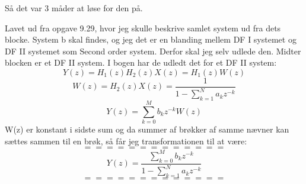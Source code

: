 \begin{Udledninger}
\begin{underrubrik}
        Så det var 3 måder at løse for den på. 
    \end{underrubrik}\clearpage
    \begin{underrubrik}
        \color{teal} Lavet ud fra opgave 9.29, hvor jeg skulle beskrive samlet system ud fra dets blocke. \color{black}
        System b skal findes, og jeg det er en blanding mellem DF I systemet og DF II systemet som Second order system. Derfor skal jeg selv udlede den. 
        Midter blocken er et DF II system.
        I bogen har de udledt det for et DF II system: 
        \[Y(z) = H_1(z)H_2(z)X(z) = H_1(z)W(z)\]
        \[W(z) = H_2(z)X(z) = \frac{1}{1 - \sum_{k = 1}^{N}{a_kz^{-k}}}\]
        \[Y(z) = \sum_{k = 0}^{M}{b_kz^{-k}W(z)}\]
        W(z) er konstant i sidste sum og da summer af brøkker af samme nævner kan sættes sammen til en brøk, så får jeg transformationen til at være: 
        \[=============\]
        \[Y(z) = \frac{\sum_{k = 0}^{M}{b_kz^{-k}}}{1 - \sum_{k = 1}^{N}{a_kz^{-k}}}\]
        \[=============\]
    \end{underrubrik}
    
\end{Udledninger}